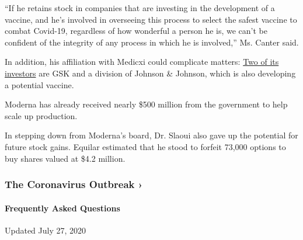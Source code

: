 ``If he retains stock in companies that are investing in the development
of a vaccine, and he's involved in overseeing this process to select the
safest vaccine to combat Covid-19, regardless of how wonderful a person
he is, we can't be confident of the integrity of any process in which he
is involved,'' Ms. Canter said.

In addition, his affiliation with Medicxi could complicate matters:
\href{https://www.medicxi.com/sections/about}{Two of its investors} are
GSK and a division of Johnson \& Johnson, which is also developing a
potential vaccine.

Moderna has already received nearly \$500 million from the government to
help scale up production.

In stepping down from Moderna's board, Dr. Slaoui also gave up the
potential for future stock gains. Equilar estimated that he stood to
forfeit 73,000 options to buy shares valued at \$4.2 million.

\href{https://www.nytimes.com/news-event/coronavirus?action=click\&pgtype=Article\&state=default\&region=MAIN_CONTENT_3\&context=storylines_faq}{}

\hypertarget{the-coronavirus-outbreak-}{%
\subsubsection{The Coronavirus Outbreak
›}\label{the-coronavirus-outbreak-}}

\hypertarget{frequently-asked-questions}{%
\paragraph{Frequently Asked
Questions}\label{frequently-asked-questions}}

Updated July 27, 2020

